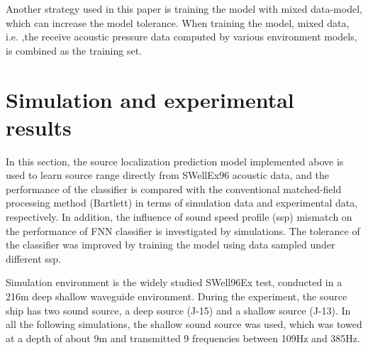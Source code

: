 Another strategy used in this paper is training the model with mixed data-model, which can increase the model tolerance.
When training the model, mixed data, i.e. ,the receive acoustic pressure data computed by various environment models, is combined as the training set.

\section{Simulation and experimental results}
In this section, the source localization prediction model implemented above is used to learn source range directly from SWellEx96 acoustic data, and the performance of the classifier is compared with the conventional matched-field processing method (Bartlett) in terms of simulation data and experimental data, respectively. In addition, the influence of sound speed profile (ssp) mismatch on the performance of FNN classifier is investigated by simulations. The tolerance of the classifier was improved by training the model using data sampled under different ssp.

Simulation environment is the widely studied SWell96Ex test, conducted in a 216m deep shallow waveguide environment.
During the experiment, the source ship has two sound source, a deep source (J-15) and a shallow source (J-13). In all the following simulations, the shallow sound source was used, which was towed at a depth of about 9m and transmitted 9 frequencies between 109Hz and 385Hz.

